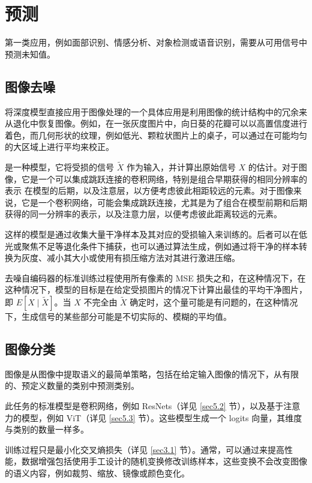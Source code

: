 \chapter{预测}\label{ch6}

第一类应用，例如面部识别、情感分析、对象检测或语音识别，需要从可用信号中预测未知值。

\section{图像去噪}\label{sec6.1}

将深度模型直接应用于图像处理的一个具体应用是利用图像的统计结构中的冗余来从退化中恢复图像。例如，在一张灰度图片中，向日葵的花瓣可以以高置信度进行着色，而几何形状的纹理，例如低光、颗粒状图片上的桌子，可以通过在可能均匀的大区域上进行平均来校正。

是一种模型，它将受损的信号 $\tilde{X}$ 作为输入，并计算出原始信号 $X$ 的估计。对于图像，它是一个可以集成跳跃连接的卷积网络，特别是组合早期获得的相同分辨率的表示 在模型的后期，以及注意层，以方便考虑彼此相距较远的元素。对于图像来说，它是一个卷积网络，可能会集成跳跃连接，尤其是为了组合在模型前期和后期获得的同一分辨率的表示，以及注意力层，以便考虑彼此距离较远的元素。

这样的模型是通过收集大量干净样本及其对应的受损输入来训练的。后者可以在低光或聚焦不足等退化条件下捕获，也可以通过算法生成，例如通过将干净的样本转换为灰度、减小其大小或使用有损压缩方法对其进行激进压缩。

去噪自编码器的标准训练过程使用所有像素的 MSE 损失之和，在这种情况下，在这种情况下，模型的目标是在给定受损图片的情况下计算出最佳的平均干净图片，即 $E[X \mid \tilde{X}]$。当 $X$ 不完全由 $\tilde{X}$ 确定时，这个量可能是有问题的，在这种情况下，生成信号的某些部分可能是不切实际的、模糊的平均值。

\section{图像分类}\label{sec6.2}

图像是从图像中提取语义的最简单策略，包括在给定输入图像的情况下，从有限的、预定义数量的类别中预测类别。

此任务的标准模型是卷积网络，例如 ResNets（详见 \ref{sec5.2} 节），以及基于注意力的模型，例如 ViT（详见 \ref{sec5.3} 节）。这些模型生成一个 logits 向量，其维度与类别的数量一样多。

训练过程只是最小化交叉熵损失（详见 \ref{sec3.1} 节）。通常，可以通过来提高性能，数据增强包括使用手工设计的随机变换修改训练样本，这些变换不会改变图像的语义内容，例如裁剪、缩放、镜像或颜色变化。

